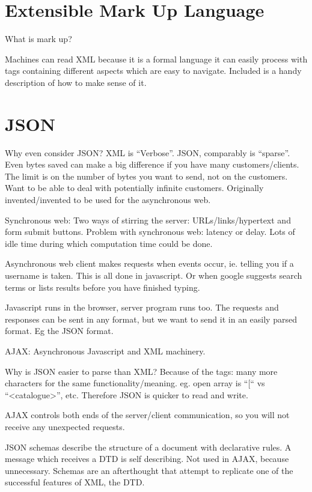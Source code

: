\documentclass[11pt]{article}
\begin{document}
\section{Extensible Mark Up Language}
\label{sec:XML}

What is mark up?


Machines can read XML because it is a formal language it can easily process with tags containing different aspects which are easy to navigate. Included is a handy description of how to make sense of it.



\section{JSON}

Why even consider JSON? XML is “Verbose”. JSON, comparably is “sparse”. Even bytes saved can make a big difference if you have many customers/clients. The limit is on the number of bytes you want to send, not on the customers. Want to be able to deal with potentially infinite customers. Originally invented/invented to be used for the asynchronous web.

Synchronous web:
Two ways of stirring the server: URLs/links/hypertext and form submit buttons.
Problem with synchronous web: latency or delay. Lots of idle time during which computation time could be done.

Asynchronous web
client makes requests when events occur, ie. telling you if a username is taken. This is all done in javascript. Or when google suggests search terms or lists results before you have finished typing.

Javascript runs in the browser, server program runs too. The requests and responses can be sent in any format, but we want to send it in an easily parsed format. Eg the JSON format.

AJAX: Asynchronous Javascript and XML machinery.

Why is JSON easier to parse than XML? Because of the tags: many more characters for the same functionality/meaning. eg. open array is “[“ vs “<catalogue>”, etc. Therefore JSON is quicker to read and write.

AJAX controls both ends of the server/client communication, so you will not receive any unexpected requests.

JSON schemas describe the structure of a document with declarative rules. A message which receives a DTD is self describing. Not used in AJAX, because unnecessary. Schemas are an afterthought that attempt to replicate one of the successful features of XML, the DTD.
\end{document}

